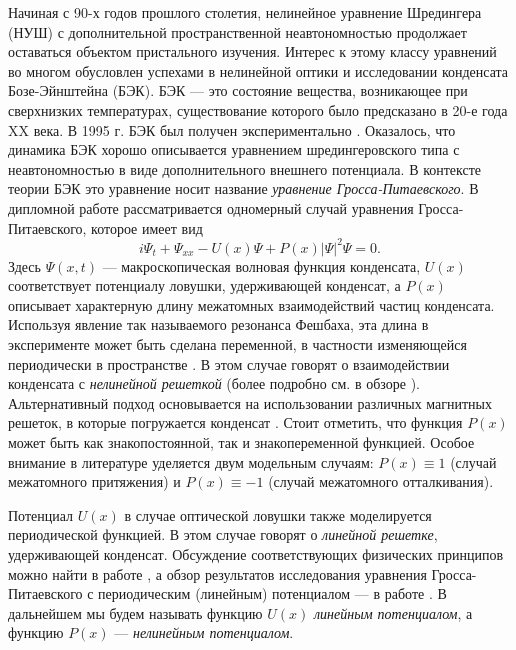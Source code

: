\intro


Начиная с 90-х годов прошлого столетия, нелинейное уравнение Шредингера (НУШ) с дополнительной пространственной неавтономностью продолжает оставаться объектом пристального изучения.
Интерес к этому классу уравнений во многом обусловлен успехами в нелинейной оптики и исследовании конденсата Бозе-Эйнштейна (БЭК).
БЭК --- это состояние вещества, возникающее при сверхнизких температурах, существование которого было предсказано в 20-е года XX века.
В 1995 г. БЭК был получен экспериментально \cite{Anderson}.
Оказалось, что динамика БЭК хорошо описывается уравнением шредингеровского типа с неавтономностью в виде дополнительного внешнего потенциала.
В контексте теории БЭК это уравнение носит название {\it уравнение Гросса-Питаевского}.
В дипломной работе рассматривается одномерный случай уравнения Гросса-Питаевского, которое имеет вид
%
\begin{equation}
i \Psi_t + \Psi_{xx} - U(x)\Psi + P(x)|\Psi|^2 \Psi = 0.
\label{eq:GPE}
\end{equation}
%
Здесь $\Psi(x, t)$ --- макроскопическая волновая функция конденсата, $U(x)$ соответствует потенциалу ловушки, удерживающей конденсат, а $P(x)$ описывает характерную длину межатомных взаимодействий частиц конденсата.
Используя явление так называемого резонанса Фешбаха, эта длина в эксперименте может быть сделана переменной, в частности изменяющейся периодически в пространстве \cite{Theis}.
В этом случае говорят о взаимодействии конденсата с {\it нелинейной решеткой} (более подробно см. в обзоре \cite{Kartashov}).
Альтернативный подход основывается на использовании различных магнитных решеток, в которые погружается конденсат \cite{Jose}.
Стоит отметить, что функция $P(x)$ может быть как знакопостоянной, так и знакопеременной функцией.
Особое внимание в литературе уделяется двум модельным случаям: $P(x) \equiv 1$ (случай межатомного притяжения) и $P(x) \equiv -1$ (случай межатомного отталкивания).

Потенциал $U(x)$ в случае оптической ловушки также моделируется периодической функцией.
В этом случае говорят о {\it линейной решетке}, удерживающей конденсат.
Обсуждение соответствующих физических принципов можно найти в работе \cite{Pitaevskii}, а обзор результатов исследования уравнения Гросса-Питаевского с периодическим (линейным) потенциалом --- в работе \citep{Brazhnyi}.
В дальнейшем мы будем называть функцию $U(x)$ {\it линейным потенциалом}, а функцию $P(x)$ --- {\it нелинейным потенциалом}.

